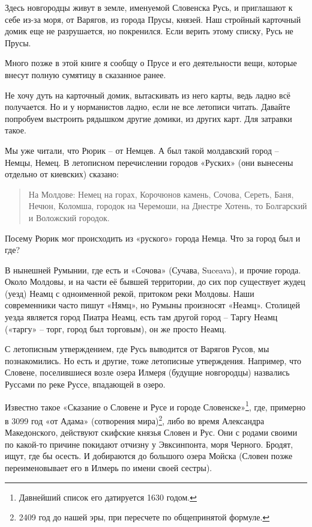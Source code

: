 Здесь новгородцы живут в земле, именуемой Словенска Русь, и приглашают к себе из-за моря, от Варягов, из города Прусы, князей. Наш стройный карточный домик еще не разрушается, но покренился. Если верить этому списку, Русь не Прусы.

Много позже в этой книге я сообщу о Прусе и его деятельности вещи, которые внесут полную сумятицу в сказанное ранее.

Не хочу дуть на карточный домик, вытаскивать из него карты, ведь ладно всё получается. Но и у норманистов ладно, если не все летописи читать. Давайте попробуем выстроить рядышком другие домики, из других карт. Для затравки такое.

Мы уже читали, что Рюрик – от Немцев. А был такой молдавский город – Немцы, Немец. В летописном перечислении городов «Руских» (они вынесены отдельно от киевских) сказано: 

\begin{quotation}
На Молдове: Немец на горах, Корочюнов камень, Сочова, Сереть, Баня, Нечюн, Коломша, городок на Черемоши, на Днестре Хотень, то Болгарский и Воложский городок.
\end{quotation}

Посему Рюрик мог происходить из «руского» города Немца. Что за город был и где?

В нынешней Румынии, где есть и «Сочова» (Сучава, Suce\-ava), и прочие города. Около Молдовы, и на части её бывшей территории, до сих пор существует жудец (уезд) Неамц с одноименной рекой, притоком реки Молдовы. Наши современники часто пишут «Нямц», но Румыны произносят «Неамц». Столицей уезда является город Пиатра Неамц, есть там другой город – Таргу Неамц («таргу» – торг, город был торговым), он же просто Неамц.

С летописным утверждением, где Русь выводится от Варягов Русов, мы познакомились. Но есть и другие, тоже летописные утверждения. Например, что Словене, поселившиеся возле озера Илмеря (будущие новгородцы) назвались Руссами по реке Руссе, впадающей в озеро.

Известно такое «Сказание о Словене и Русе и городе Словенске»\footnote{Давнейший список его датируется 1630 годом.}, где, примерно в 3099 год «от Адама» (сотворения мира)\footnote{2409 год до нашей эры, при пересчете по общепринятой формуле.}, либо во время Александра Македонского, действуют скифские князья Словен и Рус. Они с родами своими по какой-то причине покидают отчизну у Эвксинпонта, моря Черного. Бродят, ищут, где бы осесть. И добираются до большого озера Мойска (Словен позже переименовывает его в Илмерь по имени своей сестры).

